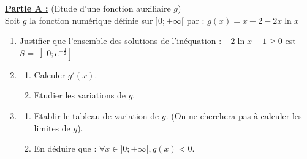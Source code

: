 \documentclass[12pt,a4paper]{article}
\begin{document}
\noindent \underline{\textbf{Partie A :}} (Etude d'une fonction auxiliaire $g$) \\
Soit $g$ la fonction numérique définie sur $]0; +\infty[$ par : 
\( g(x) = x - 2 - 2x\ln x \)
\begin{enumerate}
    \item Justifier que l'ensemble des solutions de l'inéquation : 
    $-2\ln x - 1 \ge 0$ est $S = \left] 0; e^{-\frac{1}{2}} \right]$
    \item \begin{enumerate}
        \item Calculer $g'(x)$.
        \item Etudier les variations de $g$.
    \end{enumerate}
    \item \begin{enumerate}
        \item Etablir le tableau de variation de $g$. (On ne cherchera pas à calculer les limites de $g$).
        \item En déduire que : $\forall x \in ]0; +\infty[, g(x) < 0$.
    \end{enumerate}
\end{enumerate}

\vspace{0.8cm}
\end{document}
